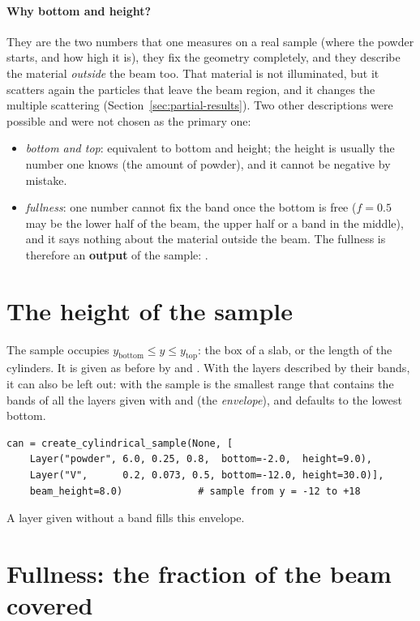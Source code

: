 \paragraph{Why bottom and height?} They are the two numbers that one measures on a real sample (where the powder
starts, and how high it is), they fix the geometry completely, and they describe the material \emph{outside} the
beam too. That material is not illuminated, but it scatters again the particles that leave the beam region, and it
changes the multiple scattering (Section~\ref{sec:partial-results}). Two other descriptions were possible and were
not chosen as the primary one:
\begin{itemize}
  \item \emph{bottom and top}: equivalent to bottom and height; the height is usually the number one knows (the
        amount of powder), and it cannot be negative by mistake.
  \item \emph{fullness}: one number cannot fix the band once the bottom is free ($f = 0.5$ may be the lower half of
        the beam, the upper half or a band in the middle), and it says nothing about the material outside the beam.
        The fullness is therefore an \textbf{output} of the sample: .
\end{itemize}

\section{The height of the sample}

The sample occupies $y_\mathrm{bottom}\leq y\leq y_\mathrm{top}$: the box of a slab, or the length of the cylinders.
It is given as before by  and . With the layers described by their bands, it can also be
left out: with  the sample is the smallest range that contains the bands of all the layers given
with  and  (the \emph{envelope}), and  defaults to the lowest bottom.
\begin{lstlisting}
can = create_cylindrical_sample(None, [
    Layer("powder", 6.0, 0.25, 0.8,  bottom=-2.0,  height=9.0),
    Layer("V",      0.2, 0.073, 0.5, bottom=-12.0, height=30.0)],
    beam_height=8.0)             # sample from y = -12 to +18
\end{lstlisting}
A layer given without a band fills this envelope.

\section{Fullness: the fraction of the beam covered}

